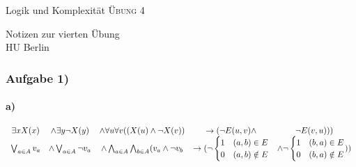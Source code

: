 \documentclass[12pt]{article}
\begin{document}
\begin{center}
\Large
Logik und Komplexität  \textsc{ Übung 4 }
\end{center}

\begin{flushright}
Notizen zur vierten Übung\\
HU Berlin \\

\vspace{2 mm}

\end{flushright}

\subsubsection*{Aufgabe 1)}
\paragraph*{a)}
\[ 
\begin{array}{ccccccc}
  \exists x X(x) &\land \exists y \neg X(y) &\land \forall u \forall v ( (X(u) \land \neg X(v) ) &\rightarrow (\neg E(u,v) \land &\neg E(v,u) ) ) \\
  \bigvee_{a\in A} v_a &\land \bigvee_{a\in A}\neg v_a &\land \bigwedge_{a\in A} \bigwedge_{b\in A} ( v_a \land \neg v_b& \rightarrow (\neg 
  \begin{cases}
    1&(a,b) \in E \\
    0&(a,b) \notin E
  \end{cases}
  & \land \neg 
  \begin{cases}
    1&(b,a) \in E \\
    0&(b,a) \notin E
  \end{cases}
  ) )
\end{array} \\
\] 
\end{document}
